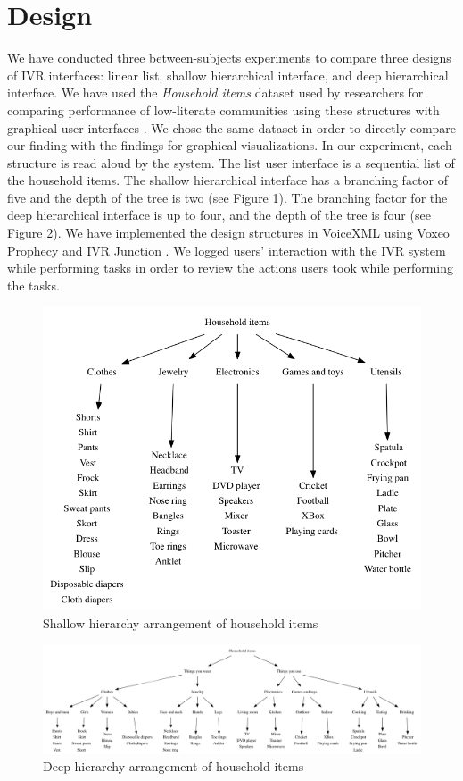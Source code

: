 \documentclass{sigchi}
\begin{document}
\section{Design}
We have conducted three between-subjects experiments to compare three designs of IVR interfaces: linear list, shallow hierarchical interface, and deep hierarchical interface. We have used the \textit{Household items} dataset used by researchers for comparing performance of low-literate communities using these structures with graphical user interfaces \cite{Medhi2013a,Medhi2013b}. We chose the same dataset in order to directly compare our finding with the findings for graphical visualizations. In our experiment, each structure is read aloud by the system. The list user interface is a sequential list of the household items. The shallow hierarchical interface has a branching factor of five and the depth of the tree is two (see Figure 1). The branching factor for the deep hierarchical interface is up to four, and the depth of the tree is four (see Figure 2). We have implemented the design structures in VoiceXML using Voxeo Prophecy and IVR Junction \cite{Vashistha}. We logged users' interaction with the IVR system while performing tasks in order to review the actions users took while performing the tasks.

\begin{figure}[!h]
\centering
\includegraphics[width=0.9\columnwidth]{ShallowHierarchy}
\caption{Shallow hierarchy arrangement of household items}
\label{fig: Figure1}
\end{figure}

\begin{figure}[!h]
\centering
\includegraphics[width=0.9\columnwidth]{DeepHierarchy}
\caption{Deep hierarchy arrangement of household items}
\label{fig: Figure2}
\end{figure}
\end{document}
